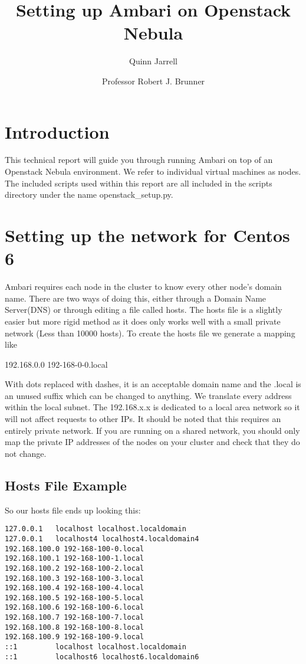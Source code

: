 \documentclass[9pt,twocolumn,twoside]{idsi}
\author[1]{Quinn Jarrell}
\author[2]{Professor Robert J. Brunner}
\affil[1]{National Center For Supercomputing Applications (NCSA)}
\affil[2]{Laboratory for Computation, Data, and Machine Learning}
\title{Setting up Ambari on Openstack Nebula}
\begin{document}

\maketitle

\section{Introduction}
This technical report will guide you through running Ambari on top of an Openstack Nebula environment. We refer to individual virtual machines as nodes. The included scripts used within this report are all included in the scripts directory under the name openstack\_setup.py. 

\section{Setting up the network for Centos 6}
\label{sec:network}

Ambari requires each node in the cluster to know every other node's domain name. There are two ways of doing this, either through a Domain Name Server(DNS) or through editing a file called hosts. The hosts file is a slightly easier but more rigid method as it does only works well with a small private network (Less than 10000 hosts). To create the hosts file we generate a mapping like

192.168.0.0 192-168-0-0.local

With dots replaced with dashes, it is an acceptable domain name and the .local is an unused suffix which can be changed to anything. We translate every address within the local subnet. The 192.168.x.x is dedicated to a local area network so it will not affect requests to other IPs. It should be noted that this requires an entirely private network. If you are running on a shared network, you should only map the private IP addresses of the nodes on your cluster and check that they do not change.


\subsection{Hosts File Example}

So our hosts file ends up looking this:
\begin{verbatim}
127.0.0.1   localhost localhost.localdomain
127.0.0.1   localhost4 localhost4.localdomain4
192.168.100.0 192-168-100-0.local
192.168.100.1 192-168-100-1.local
192.168.100.2 192-168-100-2.local
192.168.100.3 192-168-100-3.local
192.168.100.4 192-168-100-4.local
192.168.100.5 192-168-100-5.local
192.168.100.6 192-168-100-6.local
192.168.100.7 192-168-100-7.local
192.168.100.8 192-168-100-8.local
192.168.100.9 192-168-100-9.local
::1         localhost localhost.localdomain 
::1         localhost6 localhost6.localdomain6
\end{verbatim}
\end{document}
